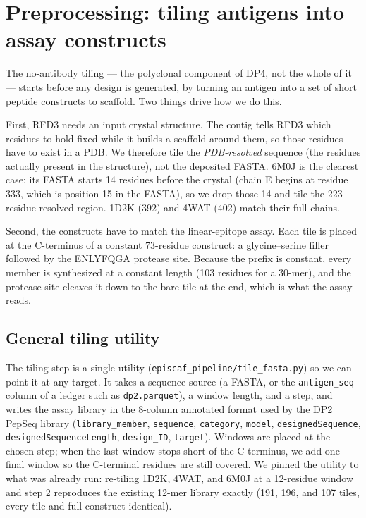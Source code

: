 \section{Preprocessing: tiling antigens into assay constructs}\label{sec:tiling}
The no-antibody tiling --- the polyclonal component of DP4, not the whole of it --- starts
before any design is generated, by turning an antigen into a set of short peptide constructs
to scaffold. Two things drive how we do this.

First, RFD3 needs an input crystal structure. The contig tells RFD3 which residues to hold
fixed while it builds a scaffold around them, so those residues have to exist in a PDB. We
therefore tile the \emph{PDB-resolved} sequence (the residues actually present in the
structure), not the deposited FASTA. 6M0J is the clearest case: its FASTA starts 14 residues
before the crystal (chain E begins at residue 333, which is position 15 in the FASTA), so we
drop those 14 and tile the 223-residue resolved region. 1D2K (392) and 4WAT (402) match
their full chains.

Second, the constructs have to match the linear-epitope assay. Each tile is placed at the
C-terminus of a constant 73-residue construct: a glycine--serine filler followed by the
ENLYFQGA protease site. Because the prefix is constant, every member is synthesized at a
constant length (103 residues for a 30-mer), and the protease site cleaves it down to the
bare tile at the end, which is what the assay reads.

\subsection{General tiling utility}
The tiling step is a single utility (\texttt{episcaf\_pipeline/tile\_fasta.py}) so we can
point it at any target. It takes a sequence source (a FASTA, or the \texttt{antigen\_seq}
column of a ledger such as \texttt{dp2.parquet}), a window length, and a step, and writes the
assay library in the 8-column annotated format used by the DP2 PepSeq library (\texttt{library\_member}, \texttt{sequence},
\texttt{category}, \texttt{model}, \texttt{designedSequence}, \texttt{designedSequenceLength},
\texttt{design\_ID}, \texttt{target}). Windows are placed at the chosen step; when the last
window stops short of the C-terminus, we add one final window so the C-terminal residues are
still covered. We pinned the utility to what was already run: re-tiling 1D2K, 4WAT, and 6M0J
at a 12-residue window and step 2 reproduces the existing 12-mer library exactly (191, 196,
and 107 tiles, every tile and full construct identical).


